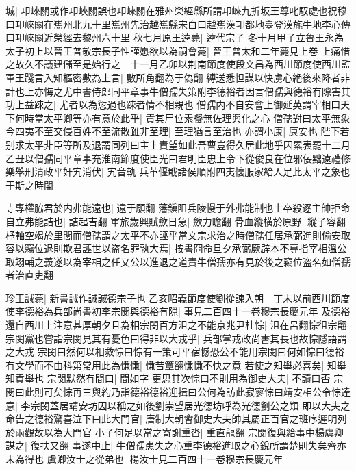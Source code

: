 城|{
	卭崍關或作卭峽關誤也卭崍關在雅州榮經縣所謂卭崍九折坂王尊叱馭處也祝穆曰卭崍關在嶲州北九十里嶲州先治越嶲縣宋白曰越嶲漢卭都地臺登漢旄牛地李心傳曰卭崍關近榮經去黎州六十里}
秋七月原王逵薨|{
	逵代宗子}
冬十月甲子立魯王永為太子初上以晉王普敬宗長子性謹愿欲以為嗣會薨|{
	晉王普太和二年薨見上卷}
上痛惜之故久不議建儲至是始行之　十一月乙卯以荆南節度使段文昌為西川節度使西川監軍王踐言入知樞密數為上言|{
	數所角翻為于偽翻}
縛送悉怛謀以快虜心絶後來降者非計也上亦悔之尤中書侍郎同平章事牛僧孺失策附李德裕者因言僧孺與德裕有隙害其功上益踈之|{
	尤者以為愆過也踈者情不相親也}
僧孺内不自安會上御延英謂宰相曰天下何時當太平卿等亦有意於此乎|{
	責其尸位素餐無佐理興化之心}
僧孺對曰太平無象今四夷不至交侵百姓不至流散雖非至理|{
	至理猶言至治也}
亦謂小康|{
	康安也}
陛下若别求太平非臣等所及退謂同列曰主上責望如此吾曹豈得久居此地乎因累表罷十二月乙丑以僧孺同平章事充淮南節度使臣光曰君明臣忠上令下從俊良在位邪佞黜遠禮修樂舉刑清政平奸宄消伏|{
	宄音軌}
兵革偃戢諸侯順附四夷懷服家給人足此太平之象也于斯之時閽

寺專權脇君於内弗能遠也|{
	遠于願翻}
藩鎭阻兵陵慢于外弗能制也士卒殺逐主帥拒命自立弗能詰也|{
	詰起吉翻}
軍旅歲興賦歛日急|{
	歛力瞻翻}
骨血縱横於原野|{
	縱子容翻}
杼軸空竭於里閭而僧孺謂之太平不亦誣乎當文宗求治之時僧孺任居承弼進則偷安取容以竊位退則欺君誣世以盗名罪孰大焉|{
	按書冏命旦夕承弼厥辟本不專指宰相溫公取翊輔之義遂以為宰相之任又公以進退之道責牛僧孺亦有見於後之竊位盗名如僧孺者治直吏翻}


珍王誠薨|{
	新書誠作諴諴德宗子也}
乙亥昭義節度使劉從諫入朝　丁未以前西川節度使李德裕為兵部尚書初李宗閔與德裕有隙|{
	事見二百四十一卷穆宗長慶元年}
及德裕還自西川上注意甚厚朝夕且為相宗閔百方沮之不能京兆尹杜悰|{
	沮在呂翻悰徂宗翻}
宗閔黨也嘗詣宗閔見其有憂色曰得非以大戎乎|{
	兵部掌戎政尚書其長也故悰隱語謂之大戎}
宗閔曰然何以相救悰曰悰有一策可平宿憾恐公不能用宗閔曰何如悰曰德裕有文學而不由科第常用此為慊慊|{
	慊苦簟翻慊慊不快之意}
若使之知舉必喜矣|{
	知舉知貢舉也}
宗閔默然有間曰|{
	間如字}
更思其次悰曰不則用為御史大夫|{
	不讀曰否}
宗閔曰此則可矣悰再三與約乃詣德裕德裕迎揖曰公何為訪此寂寥悰曰靖安相公令悰達意|{
	李宗閔蓋居靖安坊因以稱之如後劉崇望居光德坊呼為光德劉公之類}
即以大夫之命告之德裕驚喜泣下曰此大門官|{
	唐制大朝會御史大夫帥其屬正百官之班序遲明列於兩觀故以為大門官}
小子何足以當之寄謝重沓|{
	重直龍翻}
宗閔復與給事中楊虞卿謀之|{
	復扶又翻}
事遂中止|{
	牛僧孺患失之心重李德裕進取之心銳所謂楚則失矣齊亦未為得也}
虞卿汝士之從弟也|{
	楊汝士見二百四十一卷穆宗長慶元年}


